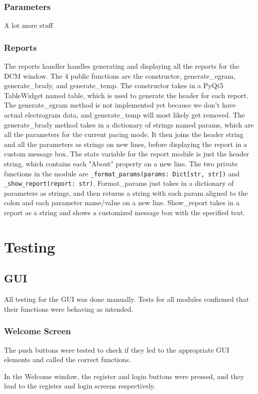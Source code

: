 \documentclass[12pt]{article}
\begin{document}
\subsubsection{Parameters}
A lot more stuff
\subsubsection{Reports}
The reports handler handles generating and displaying all the reports for the DCM window.
The 4 public functions are the constructor, generate\_egram, generate\_brady, and generate\_temp.
The constructor takes in a PyQt5 TableWidget named table, which is used to generate the header for each report.
The generate\_egram method is not implemented yet because we don't have actual electrogram data, and generate\_temp will most likely get removed.
The generate\_brady method takes in a dictionary of strings named params, which are all the parameters for the current pacing mode.
It then joins the header string and all the parameters as strings on new lines, before displaying the report in a custom message box.
The state variable for the report module is just the header string, which contains each "About" property on a new line.
The two private functions in the module are \texttt{\_format\_params(params: Dict[str, str])} and \texttt{\_show\_report(report: str)}.
Format\_params just takes in a dictionary of parameters as strings, and then returns a string with each param aligned to the colon and each parameter name/value on a new line.
Show\_report takes in a report as a string and shows a customized message box with the specified text.
\newpage
\section{Testing}
\subsection{GUI}
All testing for the GUI was done manually. Tests for all modules confirmed that their functions were behaving as intended.

\subsubsection{Welcome Screen}\label{Testing:WelcomeScreen}
The push buttons were tested to check if they led to the appropriate GUI elements and called the correct functions.

In the Welcome window, the register and login buttons were pressed, and they lead to the register and login screens respectively.
\end{document}
